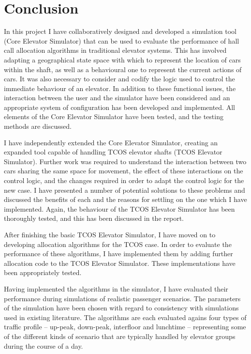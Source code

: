 \documentclass{UoYCSproject}
\begin{document}
\section{Conclusion}

In this project I have collaboratively designed and developed a simulation tool (Core Elevator Simulator) that can be used to evaluate the performance of hall call allocation algorithms in traditional elevator systems.  This has involved adapting a geographical state space with which to represent the location of cars within the shaft, as well as a behavioural one to represent the current actions of cars.  It was also necessary to consider and codify the logic used to control the immediate behaviour of an elevator.  In addition to these functional issues, the interaction between the user and the simulator have been considered and an appropriate system of configuration has been developed and implemented.  All elements of the Core Elevator Simulator have been tested, and the testing methods are discussed.

I have independently extended the Core Elevator Simulator, creating an expanded tool capable of handling TCOS elevator shafts (TCOS Elevator Simulator).  Further work was required to understand the interaction between two cars sharing the same space for movement, the effect of these interactions on the control logic, and the changes required in order to adapt the control logic for the new case.  I have presented a number of potential solutions to these problems and discussed the benefits of each and the reasons for settling on the one which I have implemented.  Again, the behaviour of the TCOS Elevator Simulator has been thoroughly tested, and this has been discussed in the report.

After finishing the basic TCOS Elevator Simulator, I have moved on to developing allocation algorithms for the TCOS case.  In order to evaluate the performance of these algorithms, I have implemented them by adding further allocation code to the TCOS Elevator Simulator.  These implementations have been appropriately tested.

Having implemented the algorithms in the simulator, I have evaluated their performance during simulations of realistic passenger scenarios.  The parameters of the simulation have been chosen with regard to consistency with simulations used in existing literature.  The algorithms are each evaluated agains four types of traffic profile -- up-peak, down-peak, interfloor and lunchtime -- representing some of the different kinds of scenario that are typically handled by elevator groups during the course of a day.
\end{document}
